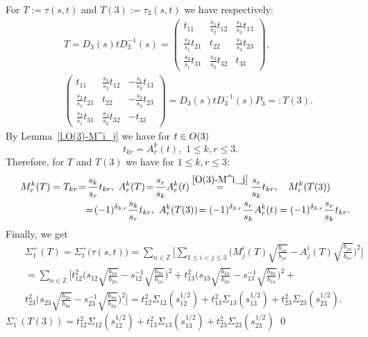 \documentclass[preprint,12pt]{elsarticle}
\numberwithin{equation}{section}
\begin{document}
\begin{pf}
%
For $T:=\tau(s,t)$ and $T(3):=\tau_3(s,t)$ we have respectively:
%
\begin{eqnarray}
 \label{T}
&&T=
D_3(s)tD_3^{-1}(s)\!=\!
\left(\!
\begin{smallmatrix}
t_{11}&\frac{s_1}{s_2}t_{12}&\frac{s_1}{s_3}t_{13}\\
\frac{s_2}{s_1}t_{21}&t_{22}&\frac{s_2}{s_3}t_{23}\\
\frac{s_3}{s_1}t_{31}&\frac{s_3}{s_2}t_{32}&t_{33}
\end{smallmatrix}
\!\right),\\
\label{T(3)}
&& 
\left(
\begin{smallmatrix}
t_{11}&\frac{s_1}{s_2}t_{12}&-\frac{s_1}{s_3}t_{13}\\
\frac{s_2}{s_1}t_{21}&t_{22}&-\frac{s_2}{s_3}t_{23}\\
\frac{s_3}{s_1}t_{31}&\frac{s_3}{s_2}t_{32}&-t_{33}
\end{smallmatrix}
\right)=
D_3(s)tD_3^{-1}(s)P_3=:T(3).
\end{eqnarray}
%
By Lemma~\ref{l.O(3)-M^i_j} we have for $t\in {\rm O}(3)$ 
\begin{equation}
\label{A(t)}
t_{kr}= A^k_r(t),\,\, 1\leq k,r\leq 3. 
\end{equation}
Therefore, for $T$ and $T(3)$ we have for $1\!\leq\! k,r\!\leq\! 3$:   
\begin{eqnarray}
\label{A(T)}
&&
M^k_r(T)=T_{kr}\!=\!\frac{s_k}{s_r}t_{kr},\,\,A^k_r(T)\!=\!\frac{s_r}{s_k}A^k_r(t)\stackrel{\eqref{O(3)-M^i_j}}{=}
\frac{s_r}{s_k}t_{kr},\quad
M^k_r(T(3))
\quad \quad
\\
\label{A(T(3))}
&&
\!=\!(-1)^{\delta_{3,r}}\frac{s_k}{s_r}t_{kr},\,
\, A^k_r(T(3))\!=(-1)^{\delta_{3,r}}\frac{s_r}{s_k}A^k_r(t)=
(-1)^{\delta_{3,r}}
\frac{s_r}{s_k}t_{kr}.
\end{eqnarray}
Finally, we get 
\begin{eqnarray*}
&& 
\Sigma_{1}^+(T)=\Sigma_{1}^+\big(\tau(s,t)\big)
=\sum_{n\in{\mathbb
Z}}\Big[
 \sum_{1\leq i<j\leq 3}\Big(M^i_j(T)\sqrt{\frac{b_{in}}{b_{jn}}} -A^i_j(T)\sqrt{\frac{b_{jn}}{b_{in}}}\Big)^2
\Big]\\
&&=\!\sum_{n\in {\mathbb Z}}\Big[
t_{12}^2\Big(%
s_{12}\sqrt{\frac{b_{1n}}{b_{2n}}}\!-\!
s_{12}^{-1}\sqrt{\frac{b_{2n}}{b_{1n}}}\Big)^2
+
t_{13}^2\Big(
s_{13}\sqrt{\frac{b_{1n}}{b_{3n}}}\!-\!
s_{13}^{-1}\sqrt{\frac{b_{3n}}{b_{1n}}}\Big)^2+\\
&&t_{23}^2\Big(
s_{23}\sqrt{\frac{b_{2n}}{b_{3n}}}\!-\!
s_{23}^{-1}\sqrt{\frac{b_{3n}}{b_{2n}}}\Big)^2
\Big]=t^2_{12}\Sigma_{12}(s_{12}^{1/2})+
t^2_{13}\Sigma_{13}(s_{13}^{1/2})+
t^2_{23}\Sigma_{23}(s_{23}^{1/2}).
\end{eqnarray*}
 $\Sigma_{1}^-(T(3))=t^2_{12}\Sigma_{12}(s_{12}^{1/2})+
t^2_{13}\Sigma_{13}(s_{13}^{1/2})+
t^2_{23}\Sigma_{23}(s_{23}^{1/2})$
\qed\end{pf}
\end{document}
